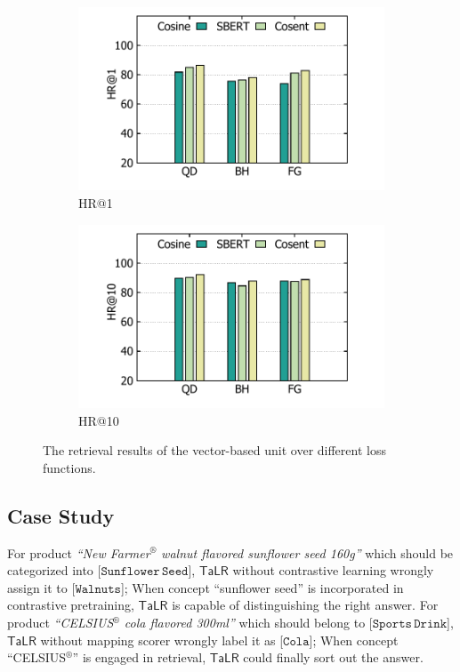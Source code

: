 \begin{figure}
  \begin{subfigure}[b]{0.49\columnwidth}
  \centering
  \includegraphics[width=\columnwidth]{hr_1.pdf}
  \caption{HR@1}
  \end{subfigure}
  \hfill
  \begin{subfigure}[b]{0.49\columnwidth}
  \centering
  \includegraphics[width=\columnwidth]{hr_10.pdf}
  \caption{HR@10}
  \end{subfigure}
  \caption{The retrieval results of the vector-based unit over different loss functions.}
  \label{fig:vector-retri}
\end{figure}

\subsection{Case Study}
\label{sec:appdix-case}
For product \textit{``New Farmer$^\circledR$ walnut flavored sunflower seed 160g''} which should be categorized into [$\mathtt{Sunflower\,Seed}$], $\mathsf{TaLR}$ without contrastive learning wrongly assign it to [$\mathtt{Walnuts}$]; When concept ``sunflower seed'' is incorporated in contrastive pretraining, $\mathsf{TaLR}$ is capable of distinguishing the right answer.
For product \textit{``CELSIUS$^\circledR$ cola flavored 300ml''} which should belong to [$\mathtt{Sports\,Drink}$], $\mathsf{TaLR}$ without mapping scorer wrongly label it as [$\mathtt{Cola}$]; When concept ``CELSIUS$^\circledR$'' is engaged in retrieval, $\mathsf{TaLR}$ could finally sort out the answer.

